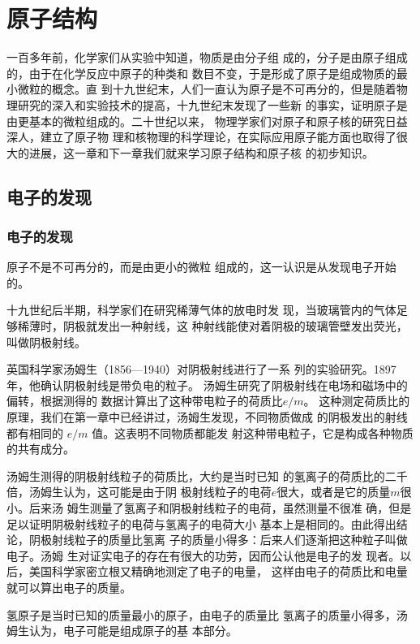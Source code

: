 \chapter{原子结构}

一百多年前，化学家们从实验中知道，物质是由分子组
成的，分子是由原子组成的，由于在化学反应中原子的种类和
数目不变，于是形成了原子是组成物质的最小微粒的概念。直
到十九世纪末，人们一直认为原子是不可再分的，但是随着物
理研究的深入和实验技术的提高，十九世纪末发现了一些新
的事实，证明原子是由更基本的微粒组成的。二十世纪以来，
物理学家们对原子和原子核的研究日益深人，建立了原子物
理和核物理的科学理论，在实际应用原子能方面也取得了很
大的进展，这一章和下一章我们就来学习原子结构和原子核
的初步知识。


\section{电子的发现}
\subsection{电子的发现}


原子不是不可再分的，而是由更小的微粒
组成的，这一认识是从发现电子开始的。

十九世纪后半期，科学家们在研究稀薄气体的放电时发
现，当玻璃管内的气体足够稀薄时，阴极就发出一种射线，这
种射线能使对着阴极的玻璃管壁发出荧光，叫做阴极射线。

英国科学家汤姆生（1856—1940）对阴极射线进行了一系
列的实验研究。1897年，他确认阴极射线是带负电的粒子。
汤姆生研究了阴极射线在电场和磁场中的偏转，根据测得的
数据计算出了这种带电粒子的荷质比$e/m$。
这种测定荷质比的
原理，我们在第一章中已经讲过，汤姆生发现，不同物质做成
的阴极发出的射线都有相同的
$e/m$
值。这表明不同物质都能发
射这种带电粒子，它是构成各种物质的共有成分。

汤姆生测得的阴极射线粒子的荷质比，大约是当时已知
的氢离子的荷质比的二千倍，汤姆生认为，这可能是由于阴
极射线粒子的电荷$e$很大，或者是它的质量$m$很小。后来汤
姆生测量了氢离子和阴极射线粒子的电荷，虽然测量不很准
确，但是足以证明阴极射线粒子的电荷与氢离子的电荷大小
基本上是相同的。由此得出结论，阴极射线粒子的质量比氢离
子的质量小得多：后来人们逐渐把这种粒子叫做电子。汤姆
生对证实电子的存在有很大的功劳，因而公认他是电子的发
现者。以后，美国科学家密立根又精确地测定了电子的电量，
这样由电子的荷质比和电量就可以算出电子的质量。

氢原子是当时已知的质量最小的原子，由电子的质量比
氢离子的质量小得多，汤姆生认为，电子可能是组成原子的基
本部分。

